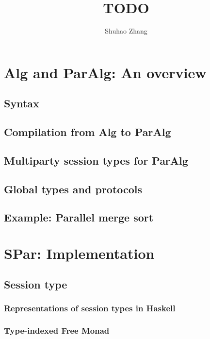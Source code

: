 \documentclass[a4paper, twoside]{report}
\title{TODO}
\author{Shuhao Zhang}
\begin{document}




\tableofcontents



% 
% 
\chapter{Alg and ParAlg: An overview}
\section{Syntax}
\section{Compilation from Alg to ParAlg}
\section{Multiparty session types for ParAlg}
\section{Global types and protocols}
\section{Example: Parallel merge sort}



\chapter{SPar: Implementation}
\section{Session type}
\subsection{Representations of session types in Haskell}
\subsection{Type-indexed Free Monad}
\end{document}
